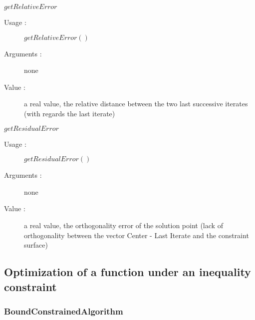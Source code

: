 \begin{description}
\begin{description}
  \item $getRelativeError$
    \begin{description}
    \item[Usage :] $getRelativeError()$
    \item[Arguments :] none
    \item[Value :] a real value, the relative distance between the two last successive iterates (with regards the last iterate)
    \end{description}
    \bigskip

  \item $getResidualError$
    \begin{description}
    \item[Usage :] $getResidualError()$
    \item[Arguments :] none
    \item[Value :]   a real value, the orthogonality error of the solution point (lack of orthogonality between the vector Center - Last Iterate and the constraint surface)
    \end{description}

  \end{description}

\end{description}



\newpage  \subsection{Optimization of a function under an inequality constraint}

\subsubsection{BoundConstrainedAlgorithm}

